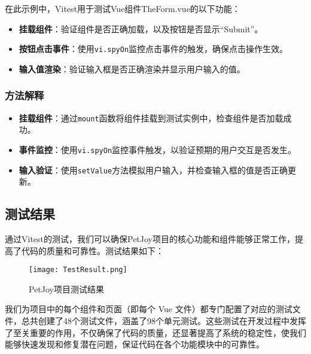 在此示例中，Vitest用于测试Vue组件TheForm.vue的以下功能：

\begin{itemize}
    \item \textbf{挂载组件}：验证组件是否正确加载，以及按钮是否显示“Submit”。
    \item \textbf{按钮点击事件}：使用\texttt{vi.spyOn}监控点击事件的触发，确保点击操作生效。
    \item \textbf{输入值渲染}：验证输入框是否正确渲染并显示用户输入的值。
\end{itemize}

\subsubsection{方法解释}

\begin{itemize}
    \item \textbf{挂载组件}：通过\texttt{mount}函数将组件挂载到测试实例中，检查组件是否加载成功。
    \item \textbf{事件监控}：使用\texttt{vi.spyOn}监控事件触发，以验证预期的用户交互是否发生。
    \item \textbf{输入验证}：使用\texttt{setValue}方法模拟用户输入，并检查输入框的值是否正确更新。
\end{itemize}

\subsection{测试结果}

通过Vitest的测试，我们可以确保PetJoy项目的核心功能和组件能够正常工作，提高了代码的质量和可靠性。测试结果如下：

\begin{figure}[H]
	\centering
	\texttt{[image: TestResult.png]}
	\caption{PetJoy项目测试结果}
\end{figure}

我们为项目中的每个组件和页面（即每个 Vue 文件）都专门配置了对应的测试文件，总共创建了48个测试文件，涵盖了98个单元测试。这些测试在开发过程中发挥了至关重要的作用，不仅确保了代码的质量，还显著提高了系统的稳定性，使我们能够快速发现和修复潜在问题，保证代码在各个功能模块中的可靠性。

